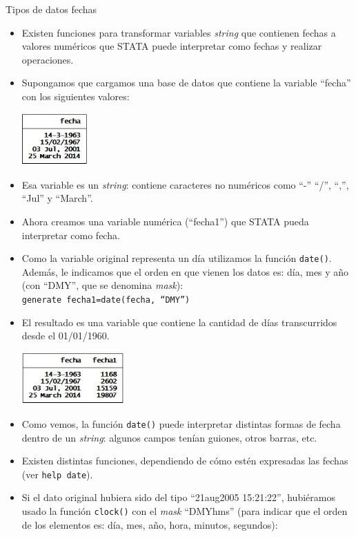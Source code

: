 \documentclass{beamer}
\begin{document}
\begin{frame}[allowframebreaks]{Tipos de datos fechas}
\begin{itemize}
\item Existen funciones para transformar variables \textit{string} que contienen fechas a valores numéricos que STATA puede interpretar como fechas y realizar operaciones.
\item Supongamos que cargamos una base de datos que contiene la variable ``fecha'' con los siguientes valores:\\\medskip
\centerline{\includegraphics[height=2cm]{fecha.jpg}}
\item Esa variable es un \textit{string}: contiene caracteres no numéricos como ``-'' ``/'', ``,'', ``Jul'' y ``March''. 
\item Ahora creamos una variable numérica (``fecha1'') que STATA pueda interpretar como fecha. 
\item Como la variable original representa un día utilizamos la función \texttt{date()}. Además, le indicamos que el orden en que vienen los datos es: día, mes y año (con ``DMY'', que se denomina \textit{mask}):\\
\texttt{generate fecha1=date(fecha, ``DMY'')}
\item El resultado es una variable que contiene la cantidad de días transcurridos desde el 01/01/1960.\\\medskip
\centerline{\includegraphics[height=2cm]{fecha1.jpg}}
\item Como vemos, la función \texttt{date()} puede interpretar distintas formas de fecha dentro de un \textit{string}: algunos campos tenían guiones, otros barras, etc.
\item Existen distintas funciones, dependiendo de cómo estén expresadas las fechas (ver \texttt{help date}).
\item Si el dato original hubiera sido del tipo ``21aug2005 15:21:22'', hubiéramos usado la función \texttt{clock()} con el \textit{mask} ``DMYhms'' (para indicar que el orden de los elementos es: día, mes, año, hora, minutos, segundos):\\

\end{itemize}
\end{frame}
\end{document}
